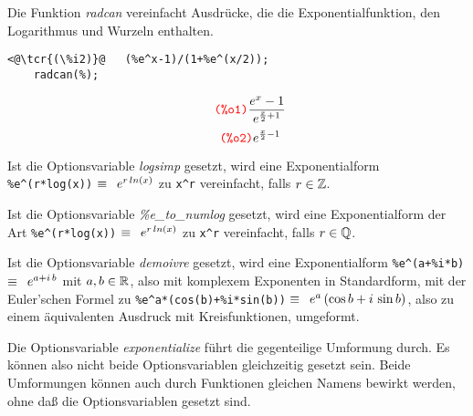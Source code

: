 \documentclass[../Maxima_Workbook.tex]{subfiles}
\begin{document}
\lz {} \hfill \tcr{[function]}

\lz Die Funktion \emph{radcan} vereinfacht Ausdrücke, die die Exponentialfunktion, den Logarithmus und Wurzeln enthalten.

\lz \begin{small}
	\color{blue} \leqn
\lz \begin{lstlisting}
<@\tcr{(\%i2)}@   (%e^x-1)/(1+%e^(x/2));
	radcan(%);
\end{lstlisting}
\vspace{-4mm} \[\tag*{\tcr{\ttfamily (\%o1)}} \frac{e^x-1}{e^{\frac{x}{2}+1}} \]
\vspace{-4mm} \[\tag*{\tcr{\ttfamily (\%o2)}} e^{\frac{x}{2}-1} \]
\color{black} \reqn
\end{small}

\lz {} \qquad {} \hfill {}

\lz Ist die Optionsvariable \emph{logsimp} gesetzt, wird eine Exponentialform \verb|%e^(r*log(x))| $ \equiv \enskip e^{r \, ln(x)} $ zu \verb|x^r| vereinfacht, falls $ r \in \mathbb{Z} $.

\lzz {} \qquad {} \hfill {}

\lz Ist die Optionsvariable \emph{\%e\_to\_numlog} gesetzt, wird eine Exponentialform der Art \verb|%e^(r*log(x))| $ \equiv \enskip e^{r \, ln(x)} $ zu \verb|x^r| vereinfacht, falls $ r \in \mathbb{Q} $.

\lzz {} \qquad {} \hfill {}

\lz Ist die Optionsvariable \emph{demoivre} gesetzt, wird eine Exponentialform \verb|%e^(a+%i*b)| $ \equiv \enskip e^{a+i \, b} $ mit $ a, b \in \mathbb{R} $, also mit komplexem Exponenten in Standardform, mit der Euler'schen Formel zu \verb|%e^a*(cos(b)+%i*sin(b))| $ \equiv \enskip e^a \, (\cos b + i \, \sin b) $, also zu einem äquivalenten Ausdruck mit Kreisfunktionen, umgeformt.

\lz Die Optionsvariable \emph{exponentialize} führt die gegenteilige Umformung durch. Es können also nicht beide Optionsvariablen gleichzeitig gesetzt sein. Beide Umformungen können auch durch Funktionen gleichen Namens bewirkt werden, ohne daß die Optionsvariablen gesetzt sind.
\end{document}
